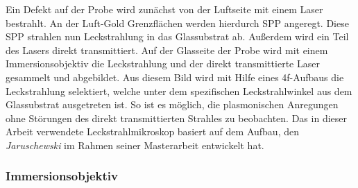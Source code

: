 \documentclass[titlepage]{article}
\begin{document}
	Ein Defekt auf der Probe wird zunächst von der Luftseite mit einem Laser bestrahlt. An der Luft-Gold Grenzflächen werden hierdurch SPP angeregt. Diese SPP strahlen nun Leckstrahlung in das Glassubstrat ab.
	Außerdem wird ein Teil des Lasers direkt transmittiert. Auf der Glasseite der Probe wird mit einem Immersionsobjektiv die Leckstrahlung und der direkt transmittierte Laser gesammelt und abgebildet.	
	 Aus diesem Bild wird mit Hilfe eines 4f-Aufbaus die Leckstrahlung selektiert, welche unter dem spezifischen Leckstrahlwinkel aus dem Glassubstrat ausgetreten ist. So ist es möglich, die plasmonischen Anregungen ohne Störungen des direkt transmittierten Strahles zu beobachten. Das in dieser Arbeit verwendete Leckstrahlmikroskop basiert auf dem Aufbau, den \textit{Jaruschewski} im Rahmen seiner Masterarbeit \cite{Jaruschewski.2020} entwickelt hat.
	\subsubsection{Immersionsobjektiv}
\end{document}
